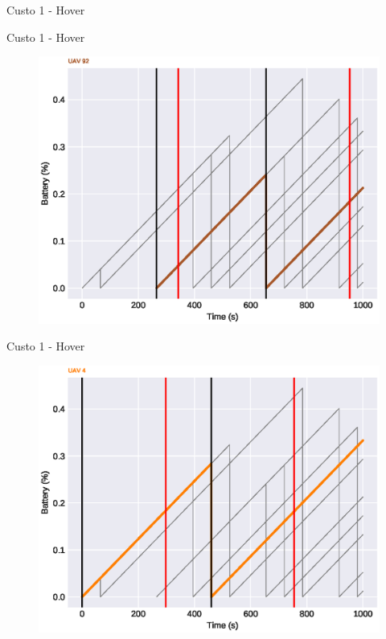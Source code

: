 \begin{frame}{Custo 1 - Hover}
\begin{figure}[!htb]
                 \end{figure}
            \end{frame}\begin{frame}{Custo 1 - Hover}
                \begin{figure}[!htb]
                     \includegraphics[width=\textwidth]{custo_1/uav_hover_acum_uav_6.eps}
                 \end{figure}
            \end{frame}\begin{frame}{Custo 1 - Hover}
                \begin{figure}[!htb]
                     \includegraphics[width=\textwidth]{custo_1/uav_hover_acum_uav_4.eps}

\end{figure}
\end{frame}
